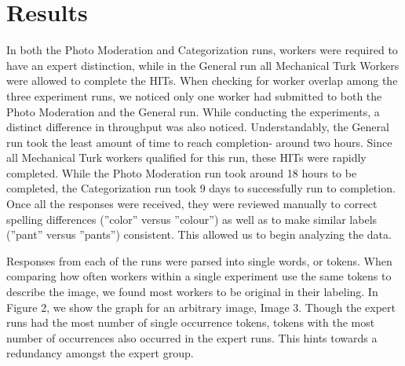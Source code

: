 \documentclass{chi2012}
\newcommand{\tab}{\hspace*{2em}}
\begin{document}
\section{Results}
\tab In both the Photo Moderation and Categorization runs, workers were required to have an expert distinction, while in the General run all Mechanical Turk Workers were allowed to complete the HITs. When checking for worker overlap among the three experiment runs, we noticed only one worker had submitted to both the Photo Moderation and the General run. While conducting the experiments, a distinct difference in throughput was also noticed. Understandably, the General run took the least amount of time to reach completion- around two hours. Since all Mechanical Turk workers qualified for this run, these HITs were rapidly completed. While the Photo Moderation run took around 18 hours to be completed, the Categorization run took 9 days to successfully run to completion. Once all the responses were received, they were reviewed manually to correct spelling differences (''color'' versus ''colour'') as well as to make similar labels (''pant'' versus ''pants'') consistent. This allowed us to begin analyzing the data.

\tab Responses from each of the runs were parsed into single words, or tokens. When comparing how often workers within a single experiment use the same tokens to describe the image, we found most workers to be original in their labeling. In Figure 2, we show the graph for an arbitrary image, Image 3. Though the expert runs had the most number of single occurrence tokens, tokens with the most number of occurrences also occurred in the expert runs. This hints towards a redundancy amongst the expert group.
 
\end{document}
